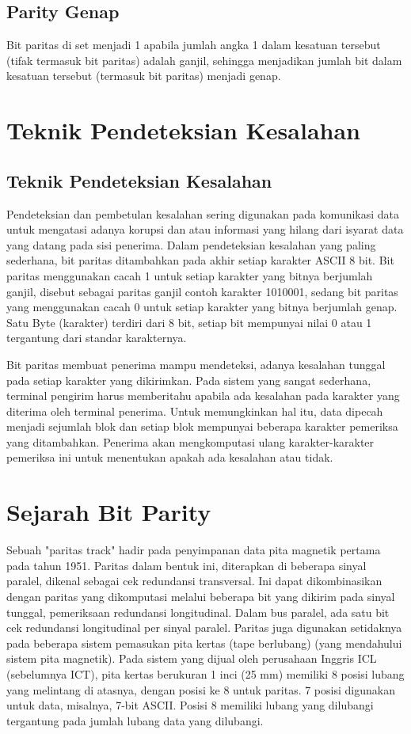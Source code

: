\subsection{Parity Genap}
Bit paritas di set menjadi 1 apabila jumlah angka 1 dalam kesatuan tersebut (tifak termasuk bit paritas) adalah ganjil, sehingga menjadikan jumlah bit dalam kesatuan tersebut (termasuk bit paritas) menjadi genap.


\section{Teknik Pendeteksian Kesalahan}
\subsection{Teknik Pendeteksian Kesalahan}
Pendeteksian dan pembetulan kesalahan sering digunakan pada komunikasi data untuk mengatasi adanya korupsi dan atau informasi yang hilang dari isyarat data yang datang pada sisi penerima. Dalam pendeteksian kesalahan yang paling sederhana, bit paritas ditambahkan pada akhir setiap karakter ASCII 8 bit. Bit paritas menggunakan cacah 1 untuk setiap karakter yang bitnya berjumlah ganjil, disebut sebagai paritas ganjil contoh karakter 1010001, sedang bit paritas yang menggunakan cacah 0 untuk setiap karakter yang bitnya berjumlah genap. Satu Byte (karakter) terdiri dari 8 bit, setiap bit mempunyai nilai 0 atau 1 tergantung dari standar karakternya.

Bit paritas membuat penerima mampu mendeteksi, adanya kesalahan tunggal pada setiap karakter yang dikirimkan. Pada sistem yang sangat sederhana, terminal pengirim harus memberitahu apabila ada kesalahan pada karakter yang diterima oleh terminal penerima. Untuk memungkinkan hal itu, data dipecah menjadi sejumlah blok dan setiap blok mempunyai beberapa karakter pemeriksa yang ditambahkan. Penerima akan mengkomputasi ulang karakter-karakter pemeriksa ini untuk menentukan apakah ada kesalahan atau tidak.




\section{Sejarah Bit Parity}
Sebuah "paritas track" hadir pada penyimpanan data pita magnetik pertama pada tahun 1951. Paritas dalam bentuk ini, diterapkan di beberapa sinyal paralel, dikenal sebagai cek redundansi transversal. Ini dapat dikombinasikan dengan paritas yang dikomputasi melalui beberapa bit yang dikirim pada sinyal tunggal, pemeriksaan redundansi longitudinal. Dalam bus paralel, ada satu bit cek redundansi longitudinal per sinyal paralel.
Paritas juga digunakan setidaknya pada beberapa sistem pemasukan pita kertas (tape berlubang) (yang mendahului sistem pita magnetik). Pada sistem yang dijual oleh perusahaan Inggris ICL (sebelumnya ICT), pita kertas berukuran 1 inci (25 mm) memiliki 8 posisi lubang yang melintang di atasnya, dengan posisi ke 8 untuk paritas. 7 posisi digunakan untuk data, misalnya, 7-bit ASCII. Posisi 8 memiliki lubang yang dilubangi tergantung pada jumlah lubang data yang dilubangi.

